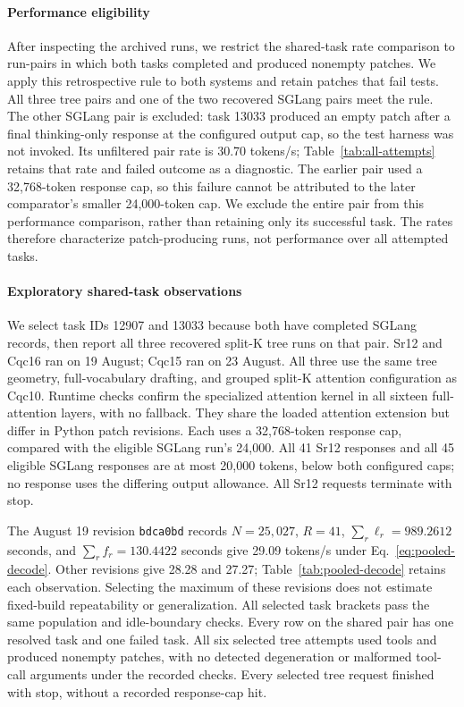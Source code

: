 \paragraph{Performance eligibility}
After inspecting the archived runs, we restrict the shared-task rate comparison to run-pairs in which both tasks completed and produced nonempty patches. We apply this retrospective rule to both systems and retain patches that fail tests. All three tree pairs and one of the two recovered SGLang pairs meet the rule. The other SGLang pair is excluded: task 13033 produced an empty patch after a final thinking-only response at the configured output cap, so the test harness was not invoked. Its unfiltered pair rate is 30.70 tokens/s; Table~\ref{tab:all-attempts} retains that rate and failed outcome as a diagnostic. The earlier pair used a 32,768-token response cap, so this failure cannot be attributed to the later comparator's smaller 24,000-token cap. We exclude the entire pair from this performance comparison, rather than retaining only its successful task. The rates therefore characterize patch-producing runs, not performance over all attempted tasks.

\paragraph{Exploratory shared-task observations}
We select task IDs 12907 and 13033 because both have completed SGLang records, then report all three recovered split-K tree runs on that pair. Sr12 and Cqc16 ran on 19 August; Cqc15 ran on 23 August. All three use the same tree geometry, full-vocabulary drafting, and grouped split-K attention configuration as Cqc10. Runtime checks confirm the specialized attention kernel in all sixteen full-attention layers, with no fallback. They share the loaded attention extension but differ in Python patch revisions. Each uses a 32,768-token response cap, compared with the eligible SGLang run's 24,000. All 41 Sr12 responses and all 45 eligible SGLang responses are at most 20,000 tokens, below both configured caps; no response uses the differing output allowance. All Sr12 requests terminate with stop.

The August 19 revision \texttt{bdca0bd} records $N=25{,}027$, $R=41$, $\sum_r\ell_r=989.2612$ seconds, and $\sum_r f_r=130.4422$ seconds give 29.09 tokens/s under Eq.~\ref{eq:pooled-decode}. Other revisions give 28.28 and 27.27; Table~\ref{tab:pooled-decode} retains each observation. Selecting the maximum of these revisions does not estimate fixed-build repeatability or generalization. All selected task brackets pass the same population and idle-boundary checks. Every row on the shared pair has one resolved task and one failed task. All six selected tree attempts used tools and produced nonempty patches, with no detected degeneration or malformed tool-call arguments under the recorded checks. Every selected tree request finished with stop, without a recorded response-cap hit.

